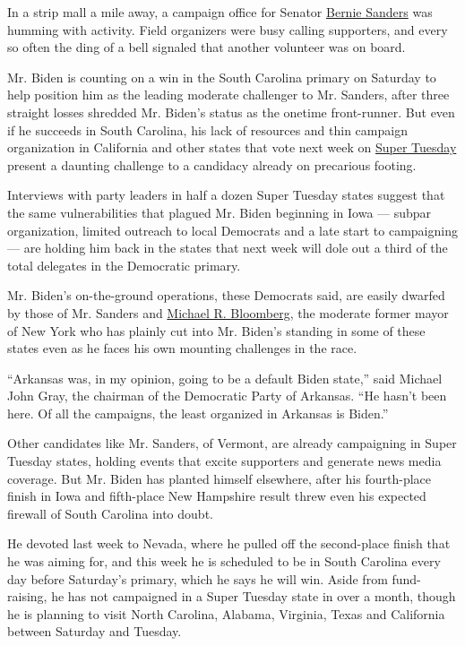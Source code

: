 In a strip mall a mile away, a campaign office for Senator
\href{https://www.nytimes3xbfgragh.onion/interactive/2020/us/elections/bernie-sanders.html}{Bernie
Sanders} was humming with activity. Field organizers were busy calling
supporters, and every so often the ding of a bell signaled that another
volunteer was on board.

Mr. Biden is counting on a win in the South Carolina primary on Saturday
to help position him as the leading moderate challenger to Mr. Sanders,
after three straight losses shredded Mr. Biden's status as the onetime
front-runner. But even if he succeeds in South Carolina, his lack of
resources and thin campaign organization in California and other states
that vote next week on
\href{https://www.nytimes3xbfgragh.onion/live/2020/super-tuesday-03-03}{Super
Tuesday} present a daunting challenge to a candidacy already on
precarious footing.

Interviews with party leaders in half a dozen Super Tuesday states
suggest that the same vulnerabilities that plagued Mr. Biden beginning
in Iowa --- subpar organization, limited outreach to local Democrats and
a late start to campaigning --- are holding him back in the states that
next week will dole out a third of the total delegates in the Democratic
primary.

Mr. Biden's on-the-ground operations, these Democrats said, are easily
dwarfed by those of Mr. Sanders and
\href{https://www.nytimes3xbfgragh.onion/interactive/2020/us/elections/michael-bloomberg.html}{Michael
R. Bloomberg}, the moderate former mayor of New York who has plainly cut
into Mr. Biden's standing in some of these states even as he faces his
own mounting challenges in the race.

``Arkansas was, in my opinion, going to be a default Biden state,'' said
Michael John Gray, the chairman of the Democratic Party of Arkansas.
``He hasn't been here. Of all the campaigns, the least organized in
Arkansas is Biden.''

Other candidates like Mr. Sanders, of Vermont, are already campaigning
in Super Tuesday states, holding events that excite supporters and
generate news media coverage. But Mr. Biden has planted himself
elsewhere, after his fourth-place finish in Iowa and fifth-place New
Hampshire result threw even his expected firewall of South Carolina into
doubt.

He devoted last week to Nevada, where he pulled off the second-place
finish that he was aiming for, and this week he is scheduled to be in
South Carolina every day before Saturday's primary, which he says he
will win. Aside from fund-raising, he has not campaigned in a Super
Tuesday state in over a month, though he is planning to visit North
Carolina, Alabama, Virginia, Texas and California between Saturday and
Tuesday.

